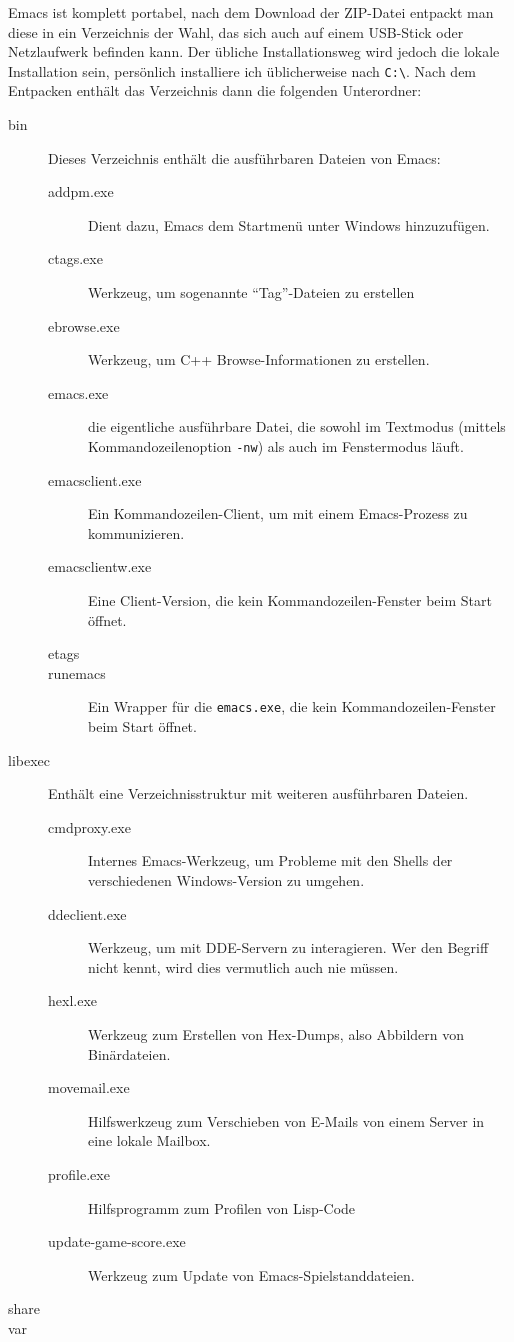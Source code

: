 \documentclass[12pt,ngerman]{scrbook}
\begin{document}
Emacs ist komplett portabel, nach dem Download der ZIP-Datei entpackt man diese in ein Verzeichnis der Wahl, das sich auch auf einem USB-Stick oder Netzlaufwerk befinden kann.
Der übliche Installationsweg wird jedoch die lokale Installation sein, persönlich installiere ich üblicherweise nach \texttt{C:\textbackslash}. Nach dem Entpacken enthält das Verzeichnis dann die folgenden Unterordner:

\begin{description}
\item[bin] Dieses Verzeichnis enthält die ausführbaren Dateien von Emacs:

\begin{description}
\item[addpm.exe] Dient dazu, Emacs dem Startmenü unter Windows hinzuzufügen.
\item[ctags.exe] Werkzeug, um sogenannte \enquote{Tag}-Dateien zu erstellen 
\item[ebrowse.exe] Werkzeug, um C++ Browse-Informationen zu erstellen.
\item[emacs.exe] die eigentliche ausführbare Datei, die sowohl im Textmodus (mittels Kommandozeilenoption \texttt{-nw}) als auch im Fenstermodus läuft. 
\item[emacsclient.exe] Ein Kommandozeilen-Client, um mit einem Emacs-Prozess zu kommunizieren.
\item[emacsclientw.exe] Eine Client-Version, die kein Kommandozeilen-Fenster beim Start öffnet.
\item[etags]
\item[runemacs] Ein Wrapper für die \texttt{emacs.exe}, die kein Kommandozeilen-Fenster beim Start öffnet.
\end{description}


\item[libexec] Enthält eine Verzeichnisstruktur mit weiteren ausführbaren Dateien.

\begin{description}
\item[cmdproxy.exe] Internes Emacs-Werkzeug, um Probleme mit den Shells der verschiedenen Windows-Version zu umgehen.
\item[ddeclient.exe] Werkzeug, um mit DDE-Servern zu interagieren. Wer den Begriff nicht kennt, wird dies vermutlich auch nie müssen.
\item[hexl.exe] Werkzeug zum Erstellen von Hex-Dumps, also Abbildern von Binärdateien.
\item[movemail.exe] Hilfswerkzeug zum Verschieben von E-Mails von einem Server in eine lokale Mailbox.
\item[profile.exe] Hilfsprogramm zum Profilen von Lisp-Code
\item[update-game-score.exe] Werkzeug zum Update von Emacs-Spielstanddateien.
\end{description}

\item[share]
\item[var]
\end{description}
\end{document}
